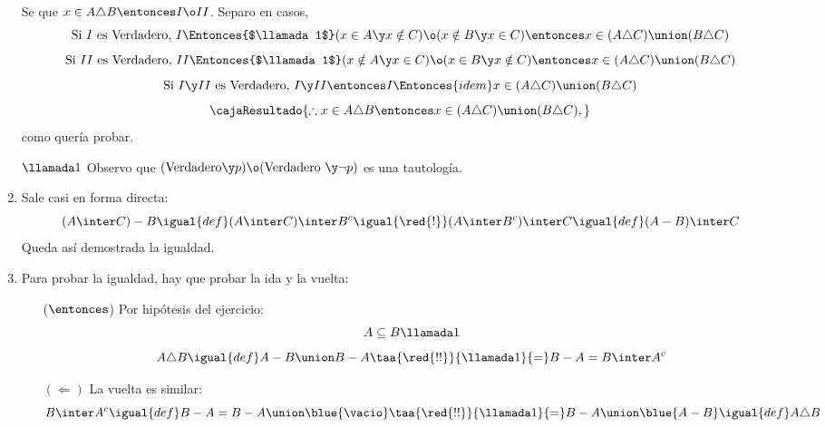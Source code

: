 \begin{enumerate}[label=\roman*)]
        Se que $x \in A \triangle B \entonces I \o II$. Separo en casos,
        $$
          \text{Si }I\text{ es Verdadero, }I \Entonces{$\llamada1$} (x \in A \y x \notin C) \o (x \notin B \y x \in C) \entonces x \in (A \triangle C) \union (B \triangle C)   \\
        $$
        $$
          \text{Si }II\text{ es Verdadero, }II \Entonces{$\llamada1$} (x \notin A \y x \in C) \o (x \in B \y x \notin C) \entonces x \in (A \triangle C) \union (B \triangle C) \\
        $$
        $$
          \text{Si }I \y II\text{ es Verdadero, }I \y II \entonces I
          \Entonces{idem}
          x \in (A \triangle C) \union (B \triangle C)
        $$
        $$
          \cajaResultado{
            \therefore x \in A \triangle B \entonces x \in (A \triangle C) \union (B \triangle C),
          }
        $$
        como quería probar.

        $\llamada1$ Observo que $(\text{Verdadero} \y p) \o (\text{Verdadero } \y \neg p)$ es una tautología.

  \item Sale casi en forma directa:
        $$
          (A \inter C) - B
          \igual{def}
          (A \inter C) \inter B^c
          \igual{\red{!}}
          (A \inter B^c) \inter C
          \igual{def}
          (A - B) \inter C
        $$
        Queda así demostrada la igualdad.

  \item Para probar la igualdad, hay que probar la ida y la vuelta:
        \begin{itemize}
          \item[($\entonces$)]
                Por hipótesis del ejercicio:
                $$
                  A \subseteq B \llamada1
                $$
                $$
                  A \triangle B
                  \igual{def}
                  A - B \union B - A
                  \taa{\red{!!}}{\llamada1}{=}
                  B - A = B \inter A^c
                $$

          \item[$(\Leftarrow)$]
                La vuelta es similar:
                $$
                  B \inter A^c
                  \igual{def}
                  B - A
                  =
                  B - A \union \blue{\vacio}
                  \taa{\red{!!}}{\llamada1}{=}
                  B - A \union \blue{A - B}
                  \igual{def}
                  A \triangle B
                $$


\end{itemize}
\end{enumerate}
